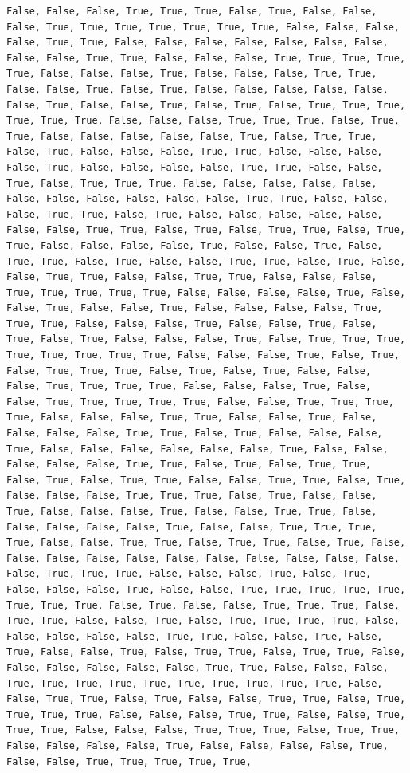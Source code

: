 \documentclass[
  letterpaper,
  DIV=11,
  numbers=noendperiod]{scrartcl}
\begin{document}
\begin{verbatim}
False, False, False, True, True, True, False, True, False, False, False, True, True, True, True, True, True, True, False, False, False, False, True, True, False, False, False, False, False, False, False, False, False, True, True, False, False, False, True, True, True, True, True, False, False, False, True, False, False, False, True, True, False, False, True, False, True, False, False, False, False, False, False, True, False, False, True, False, True, False, True, True, True, True, True, True, False, False, False, True, True, True, False, True, True, False, False, False, False, False, True, False, True, True, False, True, False, False, False, True, True, False, False, False, False, True, False, False, False, False, True, True, False, False, True, False, True, True, True, False, False, False, False, False, False, False, False, False, False, False, True, True, False, False, False, True, True, False, True, False, False, False, False, False, False, False, True, True, False, True, False, True, True, False, True, True, False, False, False, False, True, False, False, True, False, True, True, False, True, False, False, True, True, False, True, False, False, True, True, False, False, True, True, False, False, False, True, True, True, True, True, False, False, False, False, True, False, False, True, False, False, True, False, False, False, False, True, True, True, False, False, False, True, False, False, True, False, True, False, True, False, False, False, True, False, True, True, True, True, True, True, True, True, False, False, False, True, False, True, False, True, True, True, False, True, False, True, False, False, False, True, True, True, True, False, False, False, True, False, False, True, True, True, True, True, False, False, True, True, True, True, False, False, False, True, True, False, False, True, False, False, False, False, True, True, False, True, False, False, False, True, False, False, False, False, False, False, True, False, False, False, False, False, True, True, False, True, False, True, True, False, True, False, True, True, False, False, True, True, False, True, False, False, False, True, True, True, False, True, False, False, True, False, False, False, True, False, False, True, True, False, False, False, False, False, True, False, False, True, True, True, True, False, False, True, True, False, True, True, False, True, False, False, False, False, False, False, False, False, False, False, False, False, True, True, True, False, False, False, True, False, True, False, False, False, True, False, False, True, True, True, True, True, True, True, True, False, True, False, False, True, True, True, False, True, True, False, False, True, False, True, True, True, True, False, False, False, False, False, True, True, False, False, True, False, True, False, False, True, False, True, True, False, True, True, False, False, False, False, False, False, True, True, False, False, False, True, True, True, True, True, True, True, True, True, True, False, False, True, True, False, True, False, False, True, True, False, True, True, True, True, False, False, False, True, True, False, False, True, True, True, False, False, False, True, True, True, False, True, True, False, False, False, False, True, False, False, False, False, True, False, False, True, True, True, True, True, 
\end{verbatim}
\end{document}
